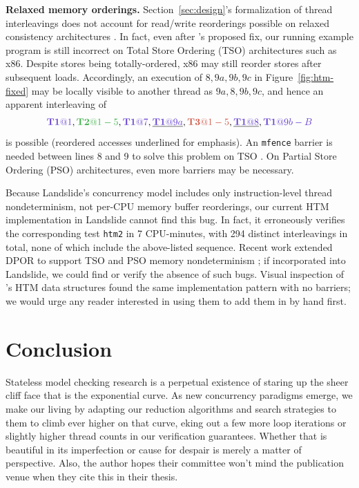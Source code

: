 \documentclass[10pt]{sigplanconf}
\begin{document}
{\bf Relaxed memory orderings.}
Section~\ref{sec:design}'s formalization of thread interleavings does not account for read/write reorderings
possible on relaxed consistency architectures \cite{memory-consistency-models}.
In fact,
even after \cite{htm-mario}'s proposed fix,
our running example program is still incorrect on Total Store Ordering (TSO) architectures such as x86.
Despite stores being totally-ordered, x86 may still reorder stores after subsequent loads.
Accordingly, an execution of $8,9a,9b,9c$ in Figure~\ref{fig:htm-fixed}
may be locally visible to another thread as $9a,8,9b,9c$,
and hence an apparent interleaving of
\[
	\tiat{1},\tjat{1-5},\tiat{7},\underline{\tiat{9a}},\tkat{1-5},\underline{\tiat{8}},\tiat{9b-B}
\]
is possible
(reordered accesses underlined for emphasis).
An {\tt mfence} barrier is needed between lines 8 and 9 to solve this problem on TSO \cite{tsx-need-barrier}.
On Partial Store Ordering (PSO) architectures, even more barriers may be necessary.

Because Landslide's concurrency model includes only instruction-level thread nondeterminism,
not per-CPU memory buffer reorderings,
our current HTM implementation in Landslide cannot find this bug.
In fact, it erroneously verifies the corresponding test {\tt htm2} in 7 CPU-minutes,
with 294 distinct interleavings in total,
none of which include the above-listed sequence.
Recent work extended DPOR to support TSO and PSO memory nondeterminism \cite{tsopso};
if incorporated into Landslide, we could find or verify the absence of such bugs.
Visual inspection of \cite{htm-mario}'s HTM data structures found the same implementation pattern with no barriers;
we would urge any reader interested in using them to add them in by hand first.


\section{Conclusion}

Stateless model checking research is a perpetual existence of staring up the sheer cliff face that is the exponential curve.
As new concurrency paradigms emerge,
we make our living by adapting our reduction algorithms and search strategies to them to climb ever higher on that curve,
eking out a few more loop iterations or slightly higher thread counts in our verification guarantees.
Whether that is beautiful in its imperfection or cause for despair is merely a matter of perspective.
Also, the author hopes their committee won't mind the publication venue when they cite this in their thesis.
\end{document}
